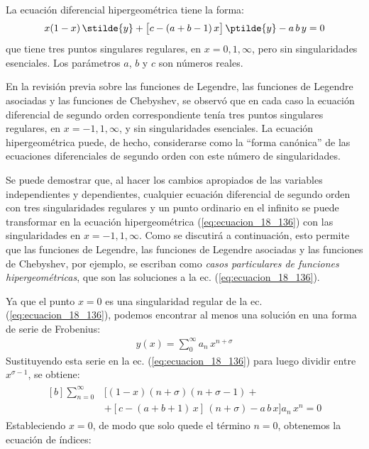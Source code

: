 La ecuación diferencial hipergeométrica tiene la forma:
\begin{align}
x (1 - x) \, \stilde{y} + \big[ c - (a + b - 1) \, x \big] \, \ptilde{y} -  a \, b \, y = 0
\label{eq:ecuacion_18_136}
\end{align}
que tiene tres puntos singulares regulares, en $x = 0, 1, \infty$, pero sin singularidades esenciales. Los parámetros $a$, $b$ y $c$ son números reales.
\par
En la revisión previa sobre las funciones de Legendre, las funciones de Legendre asociadas y las funciones de Chebyshev, se observó que en cada caso la ecuación diferencial de segundo orden correspondiente tenía tres puntos singulares regulares, en $x = -1, 1 , \infty$, y sin singularidades esenciales. La ecuación hipergeométrica puede, de hecho, considerarse como la \enquote{forma canónica} de las ecuaciones diferenciales de segundo orden con este número de singularidades.
\par
Se puede demostrar que, al hacer los cambios apropiados de las variables independientes y dependientes, cualquier ecuación diferencial de segundo orden con tres singularidades regulares y un punto ordinario en el infinito se puede transformar en la ecuación hipergeométrica (\ref{eq:ecuacion_18_136}) con las singularidades en $x= -1 , 1, \infty$. Como se discutirá a continuación, esto permite que las funciones de Legendre, las funciones de Legendre asociadas y las funciones de Chebyshev, por ejemplo, se escriban como \emph{casos particulares de funciones hipergeométricas}, que son las soluciones a la ec. (\ref{eq:ecuacion_18_136}).
\par
Ya que el punto $x = 0$ es una singularidad regular de la ec. (\ref{eq:ecuacion_18_136}), podemos encontrar al menos una solución en una forma de serie de Frobenius:
\begin{align}
y(x) = \sum_{0}^{\infty} a_{n} \, x^{n+\sigma}
\label{eq:ecuacion_18_137}
\end{align}
Sustituyendo esta serie en la ec. (\ref{eq:ecuacion_18_136}) para luego dividir entre $x^{\sigma-1}$, se obtiene:
\begin{align}
\begin{aligned}[b]
\sum_{n=0}^{\infty} &\big[ (1 - x)(n + \sigma)(n + \sigma - 1) + \\[0.5em]
&+ [c - (a + b + 1) \, x] \, (n + \sigma) - a \, b \, x \big] a_{n} \, x^{n} = 0
\end{aligned}
\label{eq:ecuacion_18_138}
\end{align}
Estableciendo $x = 0$, de modo que solo quede el término $n = 0$, obtenemos la ecuación de índices:
